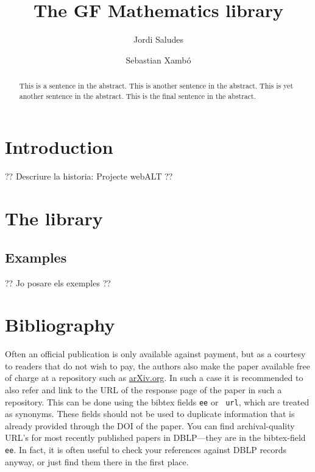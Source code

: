 \documentclass[adraft,copyright,creativecommons]{eptcs}
\title{The GF Mathematics library}
\author{Jordi Saludes
\institute{UPC}
\institute{Sistemes Avan\c cats de Control}\\
\email{jordi.saludes@upc.edu}
\and
Sebastian Xamb\'o
\institute{Universitat Polit\`ecnica de Catalunya.\\Barcelona, Spain}
\email{\quad ??}
}
\begin{document}
\maketitle

\begin{abstract}
This is a sentence in the abstract.
This is another sentence in the abstract.
This is yet another sentence in the abstract.
This is the final sentence in the abstract.
\end{abstract}

\section{Introduction} %
\label{sec:introduction}


?? Descriure la historia: Projecte webALT ??


\section{The library} %
\label{sec:the_library}

\subsection{Examples} %
\label{sub:examples}
?? Jo posare els exemples ??





\section{Bibliography}

Often an official publication is only available against payment, but
as a courtesy to readers that do not wish to pay, the authors also
make the paper available free of charge at a repository such as
\url{arXiv.org}. In such a case it is recommended to also refer and
link to the URL of the response page of the paper in such a
repository.  This can be done using the bibtex fields {\tt ee} or {\tt
url}, which are treated as synonyms.  These fields should not be used
to duplicate information that is already provided through the DOI of
the paper.
You can find archival-quality URL's for most recently published papers
in DBLP---they are in the bibtex-field {\tt ee}. In fact, it is often
useful to check your references against DBLP records anyway, or just find
them there in the first place.


\nocite{*}


\end{document}
